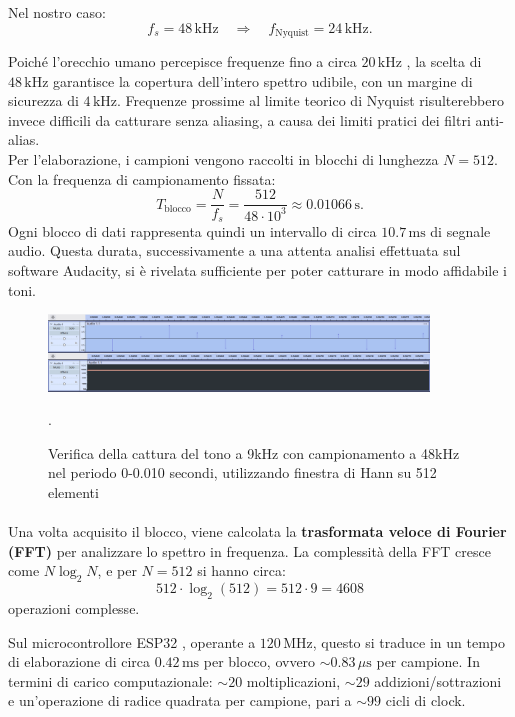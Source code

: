 Nel nostro caso:
\[
f_s = 48\,\text{kHz} \quad \Rightarrow \quad f_{\text{Nyquist}} = 24\,\text{kHz}.
\]

Poiché l’orecchio umano percepisce frequenze fino a circa $20\,\text{kHz}$ \cite{zwicker1999psychoacoustics}, la scelta di $48\,\text{kHz}$ garantisce la copertura dell’intero spettro udibile, con un margine di sicurezza di $4\,\text{kHz}$. Frequenze prossime al limite teorico di Nyquist risulterebbero invece difficili da catturare senza aliasing, a causa dei limiti pratici dei filtri anti-alias. \\

\noindent
Per l’elaborazione, i campioni vengono raccolti in blocchi di lunghezza $N = 512$. Con la frequenza di campionamento fissata:
\[
T_{\text{blocco}} = \frac{N}{f_s} = \frac{512}{48 \cdot 10^3} \approx 0.01066\,\text{s}.
\]
Ogni blocco di dati rappresenta quindi un intervallo di circa $10.7\,\text{ms}$ di segnale audio.  
Questa durata, successivamente a una attenta analisi effettuata sul software Audacity, si è rivelata sufficiente per poter catturare in modo affidabile i toni.
\begin{figure}[H]
    \centering
    \includegraphics[width=0.9\textwidth]{immagini/audacity_spectrum.png}
    \caption{Verifica della cattura del tono a 9kHz con campionamento a 48kHz nel periodo 0-0.010 secondi, utilizzando finestra di Hann su 512 elementi}.
    \label{fig:spettro_audacity}
\end{figure}


\paragraph{}
\label{par: fft_calcolo}
\noindent
Una volta acquisito il blocco, viene calcolata la \textbf{trasformata veloce di Fourier (FFT)} \cite{cooley1965fft} per analizzare lo spettro in frequenza. La complessità della FFT cresce come $N \log_2 N$, e per $N=512$ si hanno circa:
\[
512 \cdot \log_2(512) = 512 \cdot 9 = 4608
\]
operazioni complesse.  

Sul microcontrollore ESP32 \cite{esp32techref}, operante a $120\,\text{MHz}$, questo si traduce in un tempo di elaborazione di circa $0.42\,\text{ms}$ per blocco, ovvero $\sim 0.83\,\mu\text{s}$ per campione. In termini di carico computazionale: $\sim 20$ moltiplicazioni, $\sim 29$ addizioni/sottrazioni e un’operazione di radice quadrata per campione, pari a $\sim 99$ cicli di clock.  

